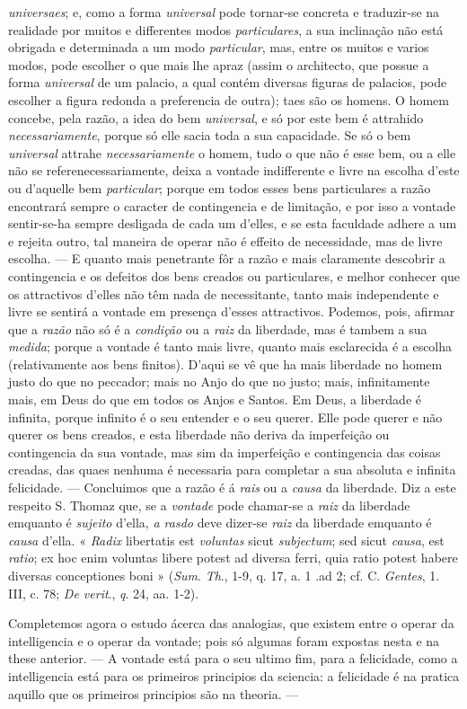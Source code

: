 \emph{universaes}; e, como a forma \emph{universal} pode tornar-se concreta e traduzir-se na realidade por muitos e differentes modos \emph{particulares}, a sua inclinação não está obrigada e determinada a um modo \emph{particular}, mas, entre os muitos e varios modos, pode escolher o que mais lhe apraz (assim o architecto, que possue a forma \emph{universal} de um palacio, a qual contém diversas figuras de palacios, pode escolher a figura redonda a preferencia de outra); taes são os homens. O homem concebe, pela razão, a idea do bem \emph{universal}, e só por este bem é attrahido \emph{necessariamente}, porque só elle sacia toda a sua capacidade. Se só o bem \emph{universal} attrahe \emph{necessariamente} o homem, tudo o que não é esse bem, ou a elle não se referenecessariamente, deixa a vontade indifferente e livre na escolha d'este ou d'aquelle bem \emph{particular}; porque em todos esses bens particulares a razão encontrará sempre o caracter de contingencia e de limitação, e por isso a vontade sentir-se-ha sempre desligada de cada um d'elles, e se esta faculdade adhere a um e rejeita outro, tal maneira de operar não é effeito de necessidade, mas de livre escolha. --- E quanto mais penetrante fôr a razão e mais claramente descobrir a contingencia e os defeitos dos bens creados ou particulares, e melhor conhecer que os attractivos d'elles não têm nada de necessitante, tanto mais independente e livre se sentirá a vontade em presença d'esses attractivos. Podemos, pois, afirmar que a \emph{razão} não só é a \emph{condição} ou a \emph{raiz} da liberdade, mas é tambem a sua \emph{medida}; porque a vontade é tanto mais livre, quanto mais esclarecida é a escolha (relativamente aos bens finitos). D'aqui se vê que ha mais liberdade no homem justo do que no peccador; mais no Anjo do que no justo; mais, infinitamente mais, em Deus do que em todos os Anjos e Santos. Em Deus, a liberdade é infinita, porque infinito é o seu entender e o seu querer. Elle pode querer e não querer os bens creados, e esta liberdade não deriva da imperfeição ou contingencia da sua vontade, mas sim da imperfeição e contingencia das coisas creadas, das quaes nenhuma é necessaria para completar a sua absoluta e infinita felicidade. --- Concluimos que a razão é á \emph{rais} ou a \emph{causa} da liberdade. Diz a este respeito S. Thomaz que, se a \emph{vontade} pode chamar-se a \emph{raiz} da liberdade emquanto é \emph{sujeito} d'ella, \emph{a rasdo} deve dizer-se \emph{raiz} da liberdade emquanto é \emph{causa} d'ella. « \emph{Radix} libertatis est \emph{voluntas} sicut \emph{subjectum}; sed sicut \emph{causa}, est \emph{ratio}; ex hoc enim voluntas libere potest ad diversa ferri, quia ratio potest habere diversas conceptiones boni » (\emph{Sum}. \emph{Th}., 1-9, q. 17, a. 1 .ad 2; cf. C. \emph{Gentes}, 1. III, c. 78; \emph{De verit}., \emph{q}. 24, aa. 1-2).\par Completemos agora o estudo ácerca das analogias, que existem entre o operar da intelligencia e o operar da vontade; pois só algumas foram expostas nesta e na these anterior. --- A vontade está para o seu ultimo fim, para a felicidade, como a intelligencia está para os primeiros principios da sciencia: a felicidade é na pratica aquillo que os primeiros principios são na theoria. --- 